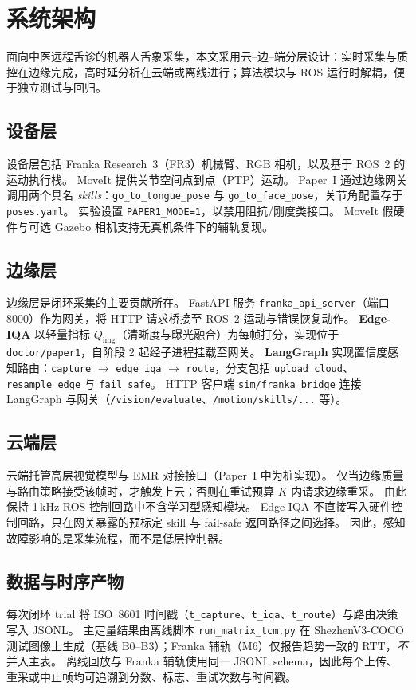 \section{系统架构}
\label{sec:system-zh}

面向中医远程舌诊的机器人舌象采集，本文采用云--边--端分层设计：实时采集与质控在边缘完成，高时延分析在云端或离线进行；算法模块与 ROS 运行时解耦，便于独立测试与回归。

\subsection{设备层}
设备层包括 Franka Research~3（FR3）机械臂、RGB 相机，以及基于 ROS~2 的运动执行栈。
MoveIt 提供关节空间点到点（PTP）运动。
Paper~I 通过边缘网关调用两个具名 \emph{skills}：\texttt{go\_to\_tongue\_pose} 与 \texttt{go\_to\_face\_pose}，关节角配置存于 \texttt{poses.yaml}。
实验设置 \texttt{PAPER1\_MODE=1}，以禁用阻抗/刚度类接口。
MoveIt 假硬件与可选 Gazebo 相机支持无真机条件下的辅轨复现。

\subsection{边缘层}
边缘层是闭环采集的主要贡献所在。
FastAPI 服务 \texttt{franka\_api\_server}（端口 8000）作为网关，将 HTTP 请求桥接至 ROS~2 运动与错误恢复动作。
\textbf{Edge-IQA} 以轻量指标 $Q_{\mathrm{img}}$（清晰度与曝光融合）为每帧打分，实现位于 \texttt{doctor/paper1}，自阶段 2 起经子进程挂载至网关。
\textbf{LangGraph} 实现置信度感知路由：\texttt{capture} $\rightarrow$ \texttt{edge\_iqa} $\rightarrow$ \texttt{route}，分支包括 \texttt{upload\_cloud}、\texttt{resample\_edge} 与 \texttt{fail\_safe}。
HTTP 客户端 \texttt{sim/franka\_bridge} 连接 LangGraph 与网关（\texttt{/vision/evaluate}、\texttt{/motion/skills/...} 等）。

\subsection{云端层}
云端托管高层视觉模型与 EMR 对接接口（Paper~I 中为桩实现）。
仅当边缘质量与路由策略接受该帧时，才触发上云；否则在重试预算 $K$ 内请求边缘重采。
由此保持 1\,kHz ROS 控制回路中不含学习型感知模块。
Edge-IQA 不直接写入硬件控制回路，只在网关暴露的预标定 skill 与 fail-safe 返回路径之间选择。
因此，感知故障影响的是采集流程，而不是低层控制器。

\subsection{数据与时序产物}
每次闭环 trial 将 ISO~8601 时间戳（\texttt{t\_capture}、\texttt{t\_iqa}、\texttt{t\_route}）与路由决策写入 JSONL。
主定量结果由离线脚本 \texttt{run\_matrix\_tcm.py} 在 ShezhenV3-COCO 测试图像上生成（基线 B0--B3）；Franka 辅轨（M6）仅报告趋势一致的 RTT，\emph{不}并入主表。
离线回放与 Franka 辅轨使用同一 JSONL schema，因此每个上传、重采或中止帧均可追溯到分数、标志、重试次数与时间戳。

